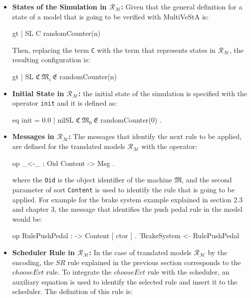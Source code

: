 \begin{itemize}
    \item \textbf{States of the Simulation in $\mathscr{R}_\mathscr{M}$:} Given that the general definition for a state of a model that is going to be verified with MultiVeStA is:
    \begin{maude}

{gt | SL} {C randomCounter(n)}\end{maude}
    Then, replacing the term \texttt{C} with the term that represents states in $\mathscr{R}_\mathscr{M}$, the resulting configuration is:
    \begin{maude}
    
{gt | SL} {$\mathfrak{C} \ \mathfrak{M}_{i}  \ \mathfrak{E}$ randomCounter(n)}\end{maude}
    
    \item \textbf{Initial State in $\mathscr{R}_\mathscr{M}$:} the initial state of the simulation is specified with the operator \texttt{init} and it is defined as:
    \begin{maude}

eq init = {0.0 | nilSL} $\mathfrak{C} \ \mathfrak{M}_{0}  \ \mathfrak{E}$ randomCounter(0) .\end{maude}
    
    \item \textbf{Messages in $\mathscr{R}_\mathscr{M}$:} The messages that identify the next rule to be applied, are defined for the translated models $\mathscr{R}_\mathscr{M}$ with the operator:
    \begin{maude}

op _<-_ : Oid Content -> Msg .\end{maude}
    
    where the \texttt{Oid} is the object identifier of the machine $\mathfrak{M}$, and the second parameter of sort \texttt{Content} is used to identify the rule that is going to be applied. For example for the brake system example explained in section 2.3 and chapter 3, the message that identifies the push pedal rule in the model would be:
    \begin{maude}

op RulePushPedal : -> Content [ ctor ] .
'BrakeSystem <- RulePushPedal\end{maude}

    \item \textbf{Scheduler Rule in $\mathscr{R}_\mathscr{M}$:} In the case of translated models $\mathscr{R}_\mathscr{M}$ by the encoding, the $SR$ rule explained in the previous section corresponds to the $chooseEvt$ rule. To integrate the $chooseEvt$ rule with the scheduler, an auxiliary equation is used to identify the selected rule and insert it to the scheduler. The definition of this rule is:
    \begin{maude}


\end{maude}
\end{itemize}
